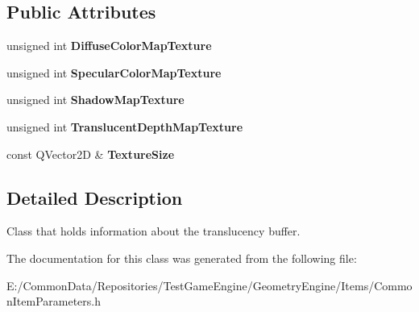\subsection*{Public Attributes}
\begin{DoxyCompactItemize}
\item 
\mbox{\label{class_geometry_engine_1_1_shading_buffer_texture_info_afdfee30ec0840829484a7cfb2a124b8b}} 
unsigned int {\bfseries Diffuse\+Color\+Map\+Texture}
\item 
\mbox{\label{class_geometry_engine_1_1_shading_buffer_texture_info_abe90e3d551158a71a1ef45430cda128c}} 
unsigned int {\bfseries Specular\+Color\+Map\+Texture}
\item 
\mbox{\label{class_geometry_engine_1_1_shading_buffer_texture_info_a04ca904dae573e84a01eb72a7ffd8b3b}} 
unsigned int {\bfseries Shadow\+Map\+Texture}
\item 
\mbox{\label{class_geometry_engine_1_1_shading_buffer_texture_info_a0daa9cd072af5755a941c3489cafef5c}} 
unsigned int {\bfseries Translucent\+Depth\+Map\+Texture}
\item 
\mbox{\label{class_geometry_engine_1_1_shading_buffer_texture_info_a9e141fec5abcba4d67d9352b04fdf38e}} 
const Q\+Vector2D \& {\bfseries Texture\+Size}
\end{DoxyCompactItemize}


\subsection{Detailed Description}
Class that holds information about the translucency buffer. 

The documentation for this class was generated from the following file\+:\begin{DoxyCompactItemize}
\item 
E\+:/\+Common\+Data/\+Repositories/\+Test\+Game\+Engine/\+Geometry\+Engine/\+Items/Common\+Item\+Parameters.\+h\end{DoxyCompactItemize}
